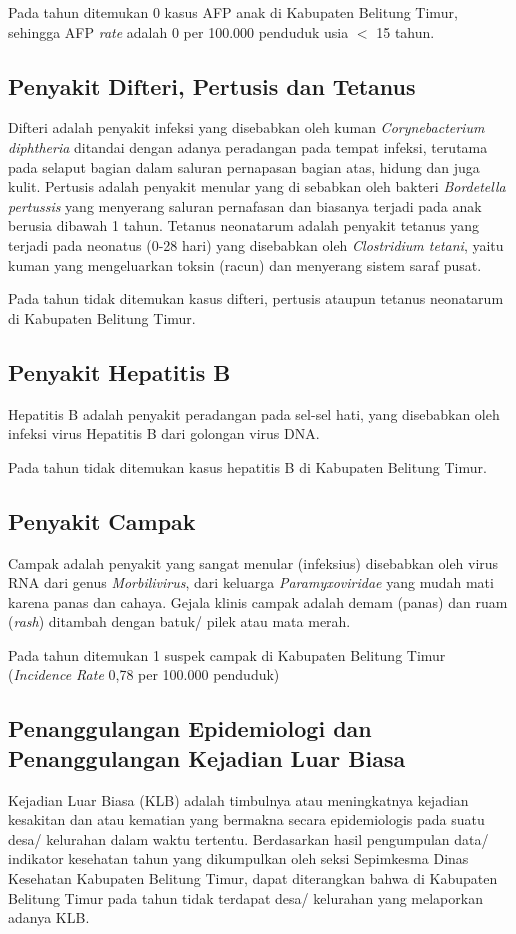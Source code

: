 Pada tahun \tP ditemukan 0 kasus AFP anak di Kabupaten Belitung Timur, sehingga AFP \emph{rate} adalah 0 per 100.000 penduduk usia $<$ 15 tahun.

\subsection{Penyakit Difteri, Pertusis dan Tetanus}
Difteri adalah penyakit infeksi yang disebabkan oleh kuman \emph{Corynebacterium diphtheria} ditandai dengan adanya peradangan pada tempat infeksi, terutama pada selaput bagian dalam saluran pernapasan bagian atas, hidung dan juga kulit.
Pertusis adalah penyakit menular yang di sebabkan oleh bakteri \emph{Bordetella pertussis} yang menyerang saluran pernafasan dan biasanya terjadi pada anak berusia dibawah 1 tahun.
Tetanus neonatarum adalah penyakit tetanus yang terjadi pada neonatus (0-28 hari) yang disebabkan oleh \emph{Clostridium tetani}, yaitu kuman yang mengeluarkan toksin (racun) dan menyerang sistem saraf pusat.

Pada tahun \tP tidak ditemukan kasus difteri, pertusis ataupun tetanus neonatarum di Kabupaten Belitung Timur.

\subsection{Penyakit Hepatitis B}
Hepatitis B adalah penyakit peradangan pada sel-sel hati, yang disebabkan oleh infeksi virus Hepatitis B dari golongan virus DNA.

Pada tahun \tP tidak ditemukan kasus hepatitis B di Kabupaten Belitung Timur.

\subsection{Penyakit Campak}
Campak adalah penyakit yang sangat menular  (infeksius)  disebabkan  oleh  virus RNA dari genus \emph{Morbilivirus}, dari keluarga \emph{Paramyxoviridae} yang mudah mati karena panas dan cahaya.
Gejala klinis campak adalah demam (panas) dan ruam (\emph{rash}) ditambah dengan batuk/ pilek atau mata merah.

Pada tahun \tP ditemukan 1 suspek campak di Kabupaten Belitung Timur (\emph{Incidence Rate} 0,78 per 100.000 penduduk)

\subsection{Penanggulangan Epidemiologi dan Penanggulangan Kejadian Luar Biasa}
Kejadian Luar Biasa (KLB) adalah timbulnya atau meningkatnya kejadian kesakitan dan atau kematian yang bermakna secara epidemiologis pada suatu desa/ kelurahan dalam waktu tertentu.
Berdasarkan hasil pengumpulan data/ indikator kesehatan tahun \tP yang dikumpulkan oleh seksi Sepimkesma Dinas Kesehatan Kabupaten Belitung Timur, dapat diterangkan bahwa di Kabupaten Belitung Timur pada tahun \tP tidak terdapat desa/ kelurahan yang melaporkan adanya KLB.

